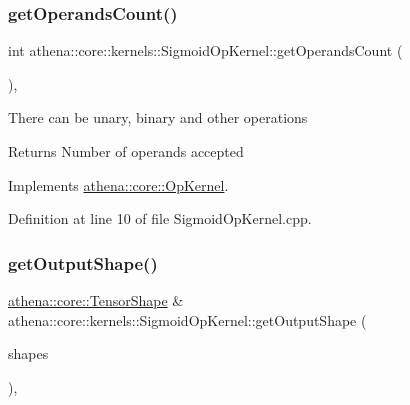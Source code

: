 \mbox{\label{classathena_1_1core_1_1kernels_1_1_sigmoid_op_kernel_acb639510462e759a92747cec8c32358b}} 
\subsubsection{\texorpdfstring{get\+Operands\+Count()}{getOperandsCount()}}
{\footnotesize\ttfamily int athena\+::core\+::kernels\+::\+Sigmoid\+Op\+Kernel\+::get\+Operands\+Count (\begin{DoxyParamCaption}{ }\end{DoxyParamCaption})\hspace{0.3cm}{\ttfamily [override]}, {\ttfamily [virtual]}}

There can be unary, binary and other operations \begin{DoxyReturn}{Returns}
Number of operands accepted 
\end{DoxyReturn}


Implements \mbox{\hyperlink{classathena_1_1core_1_1_op_kernel_add97d4c132d80ecd9915acfedf7c9119}{athena\+::core\+::\+Op\+Kernel}}.



Definition at line 10 of file Sigmoid\+Op\+Kernel.\+cpp.

\mbox{\label{classathena_1_1core_1_1kernels_1_1_sigmoid_op_kernel_abd929f41de55a4898a0fce70025c1499}} 
\subsubsection{\texorpdfstring{get\+Output\+Shape()}{getOutputShape()}}
{\footnotesize\ttfamily \mbox{\hyperlink{classathena_1_1core_1_1_tensor_shape}{athena\+::core\+::\+Tensor\+Shape}} \& athena\+::core\+::kernels\+::\+Sigmoid\+Op\+Kernel\+::get\+Output\+Shape (\begin{DoxyParamCaption}\item[{std\+::vector$<$ \mbox{\hyperlink{classathena_1_1core_1_1_tensor_shape}{athena\+::core\+::\+Tensor\+Shape}} $>$ \&}]{shapes }\end{DoxyParamCaption})\hspace{0.3cm}{\ttfamily [override]}, {\ttfamily [virtual]}}

